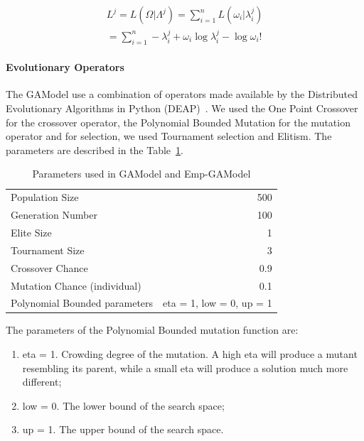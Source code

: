 \begin{equation}\label{log-like}
\begin{split}
L^j = L(\Omega|\Lambda^j) = \sum_{i=1}^{n}L(\omega_i|\lambda_i^j)  \\
= \sum_{i=1}^{n} -\lambda_i^j + \omega_i\log\lambda_i^j - \log\omega_i!  
\end{split}
\end{equation}


\paragraph{Evolutionary Operators}\label{gaOperators}
The GAModel use a combination of operators made available by the Distributed Evolutionary Algorithms in Python (DEAP)~\cite{DeRainville}. We used the One Point Crossover for the crossover operator, the Polynomial Bounded Mutation for the mutation operator and for selection, we used Tournament selection and Elitism. The parameters are described in the Table~\ref{GAParameters5.1}.

\begin{table}[H]
	\caption{Parameters used in GAModel and Emp-GAModel}
	\label{GAParameters5.1}
	\begin{center}
		\begin{tabular}{|l|r|}
			\hline
			Population Size & 500\\
			Generation Number & 100\\
			Elite Size & 1\\
			Tournament Size & 3\\
			Crossover Chance & 0.9\\
			Mutation Chance (individual) & 0.1\\
			Polynomial Bounded parameters & eta = 1, low = 0, up = 1\\
			\hline    
		\end{tabular}
	\end{center}
\end{table}

The parameters of the Polynomial Bounded mutation function are: 
\begin{enumerate}
	\item eta = 1. Crowding degree of the mutation. A high eta will produce a mutant resembling its parent, while a small eta will produce a solution much more different;
	\item low = 0. The lower bound of the search space;
	\item up = 1. The upper bound of the search space.
\end{enumerate}

